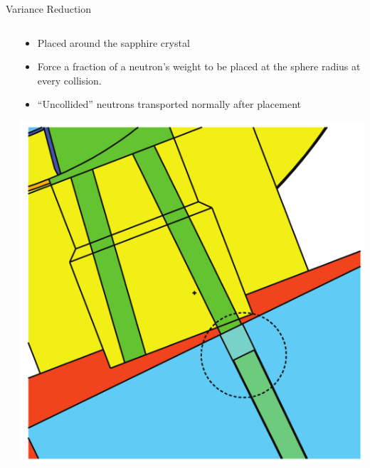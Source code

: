 \documentclass[final,t]{beamer}
\begin{document}
\begin{frame}{}
\begin{columns}[t]
\begin{column}{.3\linewidth}
\begin{block}{Variance Reduction}
\begin{columns}
\begin{column}{0.5\linewidth}
      \end{column}


      \begin{column}{0.5\linewidth}

      \begin{itemize}
      \item Placed around the sapphire crystal 
      \item Force a fraction of a neutron's weight to be placed at the sphere radius at every collision.
      \item ``Uncollided'' neutrons transported normally after placement \cite{mcnpx270}
      \end{itemize}

      \begin{center}
      \includegraphics*[width=.85\linewidth]{crystal.pdf}
      \end{center}
      
      \end{column}

      \end{columns}

      \end{block}


\end{column}
\end{columns}
\end{frame}
\end{document}

